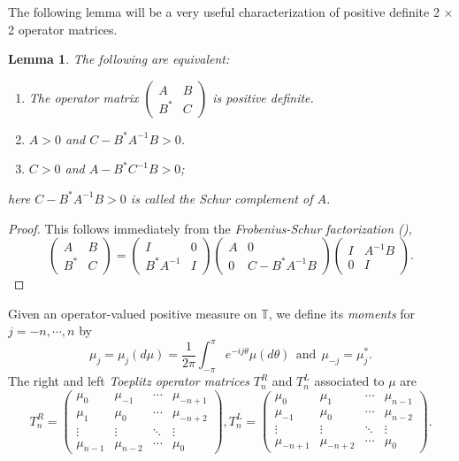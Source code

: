 \documentclass[11pt]{article}
\newtheorem{lem}{Lemma}[section]
\begin{document}
The following lemma will be a very useful characterization of positive definite 2 $\times$ 2 operator matrices.

\begin{lem}
The following are equivalent:
\begin{enumerate}
  \item The operator matrix 
  	   $
       \begin{pmatrix}
       A & B\\
       B^{*} & C
       \end{pmatrix}
       $
       is positive definite. \\
  \item $A>0$ and $C-B^{*}A^{-1}B>0$.
  \item $C>0$ and $A-B^{*}C^{-1}B>0$;
\end{enumerate}
here $C-B^{*}A^{-1}B>0$ is called the {\it Schur complement} of $A$.
\end{lem}

\begin{proof}
This follows immediately from the \it{Frobenius-Schur factorization} (\cite{Zha}), 
\begin{equation}\label{schurcomplement}
\begin{pmatrix}
A & B\\
B^{*} & C
\end{pmatrix}
=\begin{pmatrix}
I & 0\\
B^{*}A^{-1} & I
\end{pmatrix}
\begin{pmatrix}
A & 0\\
0 & C-B^{*}A^{-1}B
\end{pmatrix}
\begin{pmatrix}
I & A^{-1}B\\
0 & I
\end{pmatrix}.
\end{equation}
\end{proof}

Given an operator-valued positive measure on $\mathbb{T}$, we define its \textit{moments} for $j=-n, \cdots, n$ by $$\mu_{j}=\mu_{j}(d\mu)=\frac{1}{2\pi}\int_{-\pi}^{\pi} e^{-ij\theta} \mu(d\theta) ~~ \mathrm{and}~~ \mu_{-j}=\mu^{*}_{j}.$$
The right and left {\it Toeplitz operator matrices} $T^{R}_{n}$ and $T^{L}_{n}$ associated to $\mu$ are
\[ \label{toeplitz_TR}
T^{R}_{n}=
\begin{pmatrix}
\mu_{0} & \mu_{-1} & \cdots & \mu_{-n+1}\\
\mu_{1} & \mu_{0} & \cdots & \mu_{-n+2}\\
\vdots & \vdots & \ddots & \vdots\\
\mu_{n-1} & \mu_{n-2} & \cdots & \mu_{0}
\end{pmatrix},
T^{L}_{n}=
\begin{pmatrix}
\mu_{0} & \mu_{1} & \cdots & \mu_{n-1}\\
\mu_{-1} & \mu_{0} & \cdots & \mu_{n-2}\\
\vdots & \vdots & \ddots & \vdots\\
\mu_{-n+1} & \mu_{-n+2} & \cdots & \mu_{0}
\end{pmatrix}.
\]
\end{document}
